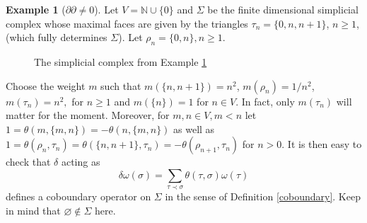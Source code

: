 \documentclass[10pt]{amsart}
\theoremstyle{definition}
\newtheorem{example}[theorem]{Example}
\begin{document}
\begin{example}[$\partial\partial\neq 0$]\label{example}
    Let $V = \mathbb{N}\cup\lbrace 0\rbrace$ and $\Sigma$ be the finite dimensional simplicial complex whose maximal faces are given by the triangles $\tau_n = \lbrace 0,n,n+1\rbrace$, $n\ge 1$, (which fully determines $\Sigma$). Let $\rho_n = \lbrace 0,n\rbrace,n\geq 1.$
    \begin{figure}[h]
    	\centering
    	
    	\label{fig:enter-label}
    	
    	\caption{The simplicial complex from Example \ref{example}}
    \end{figure}
    
     Choose the weight $m$ such that $m(\lbrace n,n+1\rbrace) = n^2$, $ m(\rho_n) = 1\slash n^2$, $m(\tau_n) = n^2,$ for $n\ge 1$ and   $m(\lbrace n\rbrace) = 1$ 
     for $n\in V$. In fact, only $m(\tau_n)$ will matter for the moment. Moreover, for $m,n\in V,m<n$ let $ 1 = \theta (m,\lbrace m,n\rbrace) = -\theta (n,\lbrace m,n\rbrace)$ as well as $ 1 = \theta(\rho_n,\tau_n) = \theta(\lbrace n,n+1\rbrace,\tau_n) = -\theta(\rho_{n+1},\tau_n)$ for $n>0.$ It is then easy to check that $\delta$ acting as $$\delta\omega(\sigma) = \sum_{\tau\prec\sigma}\theta(\tau,\sigma)\omega(\tau)$$ defines a coboundary operator on $\Sigma$ in the sense of Definition \ref{coboundary}. Keep in mind that $\varnothing\notin\Sigma$ here.
     

\end{example}
\end{document}
